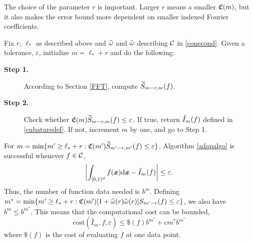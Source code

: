 \documentclass[graybox]{svmult}
\newcommand{\bsx}{\boldsymbol{x}}    %
\begin{document}
The choice of the parameter $r$ is important. Larger $r$ means a smaller $\mathfrak{C}(m)$, but it also makes the error bound more dependent on smaller indexed Fourier coefficients.

\begin{algo} \label{adapalgo} Fix $r$, $\ell_*$ as described above and $\widehat{\omega}$ and $\mathring{\omega}$ describing $\mathcal{C}$ in \eqref{conecond}. Given a tolerance, $\varepsilon$, initialize $m=\ell_*+r$ and do the following:

\begin{description}
\item[\textbf{Step 1.}] According to Section \ref{FFT}, compute $\widetilde{S}_{m-r,m}(f)$.
\item[\textbf{Step 2.}] Check whether $\mathfrak{C}(m)  \widetilde{S}_{m-r,m}(f) \le \varepsilon$. If true, return $\hat{I}_m(f)$ defined in \eqref{cubaturedef}. If not, increment $m$ by one, and go to Step 1.
\end{description}
\end{algo}

\begin{theorem} \label{adapalgothm} For $m = \min \{m' \ge \ell_*+r : \mathfrak{C}(m')  \widetilde{S}_{m'-r,m'}(f) \le \varepsilon \}$, Algorithm \ref{adapalgo} is successful whenever $f\in\mathcal{C}$,
\[
\biggabs{\int_{\cube} f(\bsx) \D \bsx - \hI_m(f)} \le \varepsilon.
\]
Thus, the number of function data needed is $b^m$. Defining $m^* = \min \{m' \ge \ell_*+r : \mathfrak{C}(m') [1+ \widehat{\omega}(r) \mathring{\omega}(r)] S_{m'-r}(f) \le \varepsilon \}$, we also have $b^m\leq b^{m^*}$. This means that the computational cost can be bounded,
\[
\mathrm{cost}\left(\widehat{I}_m,f,\varepsilon\right)\leq \$(f)b^{m^*}+cm^*b^{m^*}
\]
where $\$(f)$ is the cost of evaluating $f$ at one data point.
\end{theorem}
\end{document}
